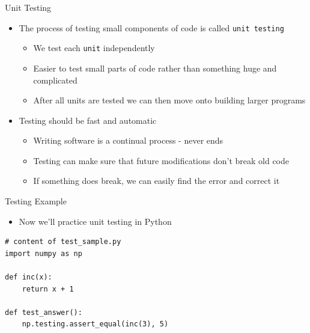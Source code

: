 \documentclass[11pt,professionalfonts]{beamer}
\begin{document}
\begin{frame}{Unit Testing}
    \begin{itemize}
        \item The process of testing small components of code is called \texttt{unit testing}
            \begin{itemize}
                \item We test each \texttt{unit} independently
                \item Easier to test small parts of code rather than something huge and complicated
                \item After all units are tested we can then move onto building larger programs
            \end{itemize}
        \item Testing should be fast and automatic
            \begin{itemize}
                \item Writing software is a continual process - never ends
                \item Testing can make sure that future modifications don't break old code 
                \item If something does break, we can easily find the error and correct it
            \end{itemize} 
    \end{itemize}
\end{frame}

\begin{frame}[fragile]{Testing Example}
    \begin{itemize}
        \item Now we'll practice unit testing in Python
    \end{itemize}
    \begin{verbatim}
# content of test_sample.py
import numpy as np

def inc(x):
    return x + 1

def test_answer():
    np.testing.assert_equal(inc(3), 5)

    \end{verbatim}
\end{frame}
\end{document}

